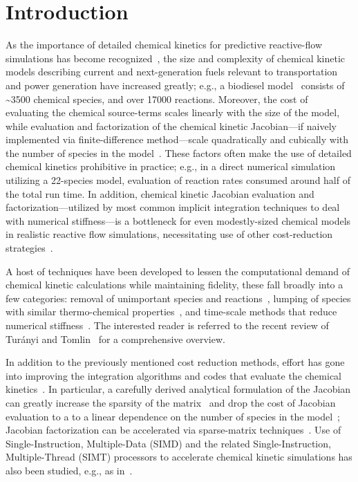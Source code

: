 \documentclass[12pt,number,sort&compress,preprint]{elsarticle}
\begin{document}
\section{Introduction}
%

As the importance of detailed chemical kinetics for predictive reactive-flow simulations has become recognized~\cite{LU2009192}, the size and complexity of chemical kinetic models describing current and next-generation fuels relevant to transportation and power generation have increased greatly; e.g., a biodiesel model~\cite{WESTBROOK2011742} consists of \textasciitilde\num{3500} chemical species, and over \num{17000} reactions.
Moreover, the cost of evaluating the chemical source-terms scales linearly with the size of the model, while evaluation and factorization of the chemical kinetic Jacobian---if naively implemented via finite-difference method---scale quadratically and cubically with the number of species in the model~\cite{LU2009192}.
These factors often make the use of detailed chemical kinetics prohibitive in practice; e.g., in a direct numerical simulation~\cite{Spafford:2010aa} utilizing a 22-species model, evaluation of reaction rates consumed around half of the total run time.
In addition, chemical kinetic Jacobian evaluation and factorization---utilized by most common implicit integration techniques to deal with numerical stiffness---is a bottleneck for even modestly-sized chemical models in realistic reactive flow simulations, necessitating use of other cost-reduction strategies~\cite{LU2009192}.

A host of techniques have been developed to lessen the computational demand of chemical kinetic calculations while maintaining fidelity, these fall broadly into a few categories: removal of unimportant species and reactions~\cite{Lu:2006bb,Pepiot-Desjardins:2008,Hiremath:2010jw,Niemeyer:2010bt,Curtis:2015}, lumping of species with similar thermo-chemical properties~\cite{Lu:2007,Ahmed:2007fa,Pepiot:2008kq}, and time-scale methods that reduce numerical stiffness~\cite{Maas:1992ws,Lam:1994ws,Lu:2001ve,Gou:2010}.
The interested reader is referred to the recent review of Tur\'anyi and Tomlin~\cite{turanyi2016analysis} for a comprehensive overview.

In addition to the previously mentioned cost reduction methods, effort has gone into improving the integration algorithms and codes that evaluate the chemical kinetics~\cite{Gou:2010,SCHWER2002270,Niemeyer:2016aa,GAO2015287}.
In particular, a carefully derived analytical formulation of the Jacobian can greatly increase the sparsity of the matrix~\cite{SCHWER2002270} and drop the cost of Jacobian evaluation to a to a linear dependence on the number of species in the model~\cite{LU2009192}; Jacobian factorization can be accelerated via sparse-matrix techniques~\cite{superlu99}.
Use of Single-Instruction, Multiple-Data (SIMD) and the related Single-Instruction, Multiple-Thread (SIMT) processors to accelerate chemical kinetic simulations has also been studied, e.g., as in~\cite{CurtisGPU:2017,Sewerin20151375,Shi:2012aa,Niemeyer:2016aa}.
\end{document}
